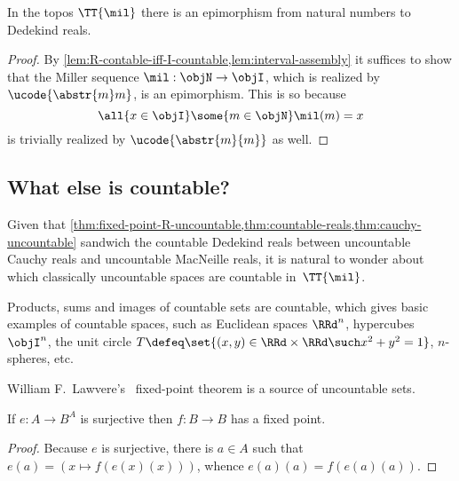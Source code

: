 \begin{theorem}
  \label{thm:countable-reals}
  In the topos $\TT{\mil}$ there is an epimorphism from natural numbers to Dedekind reals.
\end{theorem}

\begin{proof}
  By \cref{lem:R-contable-iff-I-countable,lem:interval-assembly} it suffices to show that the Miller sequence $\mil : \objN \to \objI$, which is realized by $\ucode{\abstr{m} m}$, is an epimorphism. This is so because
  \begin{equation*}
    \all{x \in \objI} \some{m \in \objN} \mil(m) = x
  \end{equation*}
  is trivially realized by $\ucode{\abstr{m}{m}}$ as well.
\end{proof}

\subsection{What else is countable?}
\label{sec:what-else-countable}
%
Given that \cref{thm:fixed-point-R-uncountable,thm:countable-reals,thm:cauchy-uncountable} sandwich the countable Dedekind reals between uncountable Cauchy reals and uncountable MacNeille reals, it is natural to wonder about which classically uncountable spaces are countable in~$\TT{\mil}$.

Products, sums and images of countable sets are countable, which gives basic examples of countable spaces, such as Euclidean spaces $\RRd^n$, hypercubes~$\objI^n$, the unit circle $T \defeq \set{(x,y) \in \RRd \times \RRd \such x^2 + y^2 = 1}$, $n$-spheres, etc.

William F.~Lawvere's~\cite{lawvere69} fixed-point theorem is a source of uncountable sets.

\begin{theoremC}[Lawvere]
  \label{thm:lawvere}
  If $e : A \to B^A$ is surjective then $f : B \to B$ has a fixed point.
\end{theoremC}

\begin{proof}
  Because $e$ is surjective,
  there is $a \in A$ such that $e(a) = (x \mapsto f(e(x)(x)))$, whence $e(a)(a) = f(e(a)(a))$.
\end{proof}

